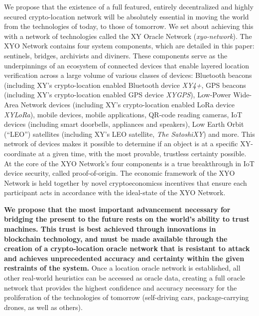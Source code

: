 \documentclass{article}
\begin{document}
We propose that the existence of a full featured, entirely decentralized and highly secured crypto-location network will be absolutely essential in moving the world from the technologies of today, to those of tomorrow. We set about achieving this with a network of technologies called the XY Oracle Network (\textit{\Gls{xyo-network}}). The XYO Network contains four system components, which are detailed in this paper: \Glspl{sentinel}, \Glspl{bridge}, \Glspl{archivist} and \Glspl{diviner}. These components serve as the underpinnings of an ecosystem of connected devices that enable layered location verification across a large volume of various classes of devices: Bluetooth beacons (including XY's crypto-location enabled Bluetooth device \textit{XY4+}, GPS beacons (including XY's crypto-location enabled GPS device \textit{XYGPS}), Low-Power Wide-Area Network devices (including XY's crypto-location enabled LoRa device \textit{XYLoRa}), mobile devices, mobile applications, QR-code reading cameras, IoT devices (including smart doorbells, appliances and speakers), Low Earth Orbit (``LEO'') satellites (including XY's LEO satellite, \textit{The SatoshiXY}) and more. This network of devices makes it possible to determine if an object is at a specific XY-coordinate at a given time, with the most provable, trustless \gls{certainty} possible. At the core of the XYO Network's four components is a true breakthrough in IoT device security, called \Gls{proof-of-origin}. The economic framework of the XYO Network is held together by novel \glspl{cryptoeconomics} incentives that ensure each participant acts in accordance with the ideal-state of the XYO Network.

\textbf{We propose that the most important advancement necessary for bridging the present to the future rests on the world's ability to trust machines. This trust is best achieved through innovations in blockchain technology, and must be made available through the creation of a crypto-location oracle network that is resistant to attack and achieves unprecedented accuracy and certainty within the given restraints of the system.} Once a location oracle network is established, all other real-world \glspl{heuristic} can be accessed as oracle data, creating a full oracle network that provides the highest confidence and accuracy necessary for the proliferation of the technologies of tomorrow (self-driving cars, package-carrying drones, as well as others).
\end{document}
